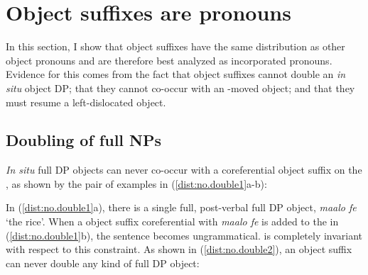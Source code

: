 \documentclass[output=paper,
modfonts
]{langscibook}
\begin{document}
\section{Object suffixes are pronouns}\label{sec:baier:2}

In this section, I show that object suffixes have the same distribution as other object pronouns and are therefore best analyzed as incorporated pronouns. Evidence for this comes from the fact that object suffixes cannot double an \textit{in situ} object DP; that they cannot co-occur with an \abar-moved object; and that they must resume a left-dislocated object.

\subsection{Doubling of full NPs}\label{sec:baier:2.1}

\textit{In situ} full DP objects can never co-occur with a coreferential object suffix on the , as shown by the pair of examples in (\ref{dist:no.double1}a-b):

\begin{exe}
\ex \label{dist:no.double1}
\begin{xlista}

\end{xlista}
\end{exe}

\noindent In (\ref{dist:no.double1}a), there is a single full, post-verbal full DP object, \textit{maalo fe} `the rice'. When a object suffix coreferential with \textit{maalo fe} is added to the  in (\ref{dist:no.double1}b), the sentence becomes ungrammatical.  is completely invariant with respect to this constraint. As shown in (\ref{dist:no.double2}), an object suffix can never double any kind of full DP object: 
\end{document}
